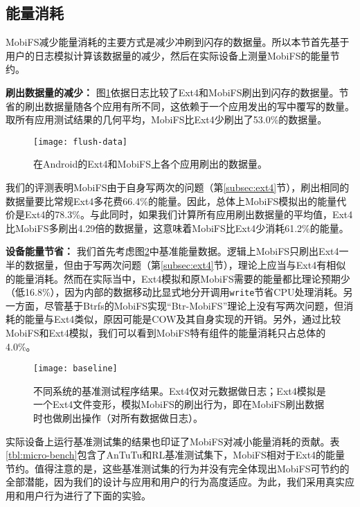 \subsection{能量消耗} \label{subsec-eval-energy}

MobiFS减少能量消耗的主要方式是减少冲刷到闪存的数据量。所以本节首先基于用户的日志模拟计算该数据量的减少，然后在实际设备上测量MobiFS的能量节约。

\noindent\textbf{刷出数据量的减少：}
图\ref{fig:flush-data}依据日志比较了Ext4和MobiFS刷出到闪存的数据量。节省的刷出数据量随各个应用有所不同，这依赖于一个应用发出的写中覆写的数量。取所有应用测试结果的几何平均，MobiFS比Ext4少刷出了53.0\%的数据量。

\begin{figure}[!ht]
  \centering
  \texttt{[image: flush-data]}
  \caption{在Android的Ext4和MobiFS上各个应用刷出的数据量。}
  \label{fig:flush-data}
\end{figure}

我们的评测表明MobiFS由于自身写两次的问题（第\ref{subsec:ext4}节），刷出相同的数据量要比常规Ext4多花费66.4\%的能量。因此，总体上MobiFS模拟出的能量代价是Ext4的78.3\%。与此同时，如果我们计算所有应用刷出数据量的平均值，Ext4比MobiFS多刷出4.29倍的数据量，这意味着MobiFS比Ext4少消耗61.2\%的能量。

\noindent\textbf{设备能量节省：}
我们首先考虑图\ref{fig:baseline}中基准能量数据。逻辑上MobiFS只刷出Ext4一半的数据量，但由于写两次问题（第\ref{subsec:ext4}节），理论上应当与Ext4有相似的能量消耗。然而在实际当中，Ext4模拟和原MobiFS需要的能量都比理论预期少（低16.8\%），因为内部的数据移动比显式地分开调用\texttt{write}节省CPU处理消耗。另一方面，尽管基于Btrfs的MobiFS实现“Btr-MobiFS”理论上没有写两次问题，但消耗的能量与Ext4类似，原因可能是COW及其自身实现的开销。另外，通过比较MobiFS和Ext4模拟，我们可以看到MobiFS特有组件的能量消耗只占总体的4.0\%。

\begin{figure}[!ht]
  \centering
  \texttt{[image: baseline]}
  \caption{不同系统的基准测试程序结果。Ext4仅对元数据做日志；Ext4模拟是一个Ext4文件变形，模拟MobiFS的刷出行为，即在MobiFS刷出数据时也做刷出操作（对所有数据做日志）。}
  \label{fig:baseline}
\end{figure}

实际设备上运行基准测试集的结果也印证了MobiFS对减小能量消耗的贡献。表\ref{tbl:micro-bench}包含了AnTuTu和RL基准测试集下，MobiFS相对于Ext4的能量节约。值得注意的是，这些基准测试集的行为并没有完全体现出MobiFS可节约的全部潜能，因为我们的设计与应用和用户的行为高度适应。为此，我们采用真实应用和用户行为进行了下面的实验。

